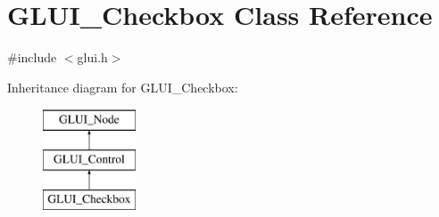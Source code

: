 \hypertarget{classGLUI__Checkbox}{\section{G\-L\-U\-I\-\_\-\-Checkbox Class Reference}
\label{classGLUI__Checkbox}
}


{\ttfamily \#include $<$glui.\-h$>$}

Inheritance diagram for G\-L\-U\-I\-\_\-\-Checkbox\-:\begin{figure}[H]
\begin{center}
\leavevmode
\includegraphics[height=3.000000cm]{classGLUI__Checkbox}
\end{center}
\end{figure}
